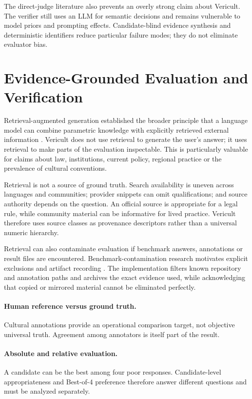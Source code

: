 The direct-judge literature also prevents an overly strong claim about Vericult. The verifier still uses an LLM for semantic decisions and remains vulnerable to model priors and prompting effects. Candidate-blind evidence synthesis and deterministic identifiers reduce particular failure modes; they do not eliminate evaluator bias.

\section{Evidence-Grounded Evaluation and Verification}
Retrieval-augmented generation established the broader principle that a language model can combine parametric knowledge with explicitly retrieved external information \parencite{lewis2020rag}. Vericult does not use retrieval to generate the user's answer; it uses retrieval to make parts of the evaluation inspectable. This is particularly valuable for claims about law, institutions, current policy, regional practice or the prevalence of cultural conventions.

Retrieval is not a source of ground truth. Search availability is uneven across languages and communities; provider snippets can omit qualifications; and source authority depends on the question. An official source is appropriate for a legal rule, while community material can be informative for lived practice. Vericult therefore uses source classes as provenance descriptors rather than a universal numeric hierarchy.

Retrieval can also contaminate evaluation if benchmark answers, annotations or result files are encountered. Benchmark-contamination research motivates explicit exclusions and artifact recording \parencite{deng2024contamination}. The implementation filters known repository and annotation paths and archives the exact evidence used, while acknowledging that copied or mirrored material cannot be eliminated perfectly.

\paragraph{Human reference versus ground truth.} Cultural annotations provide an operational comparison target, not objective universal truth. Agreement among annotators is itself part of the result.

\paragraph{Absolute and relative evaluation.} A candidate can be the best among four poor responses. Candidate-level appropriateness and Best-of-4 preference therefore answer different questions and must be analyzed separately.


